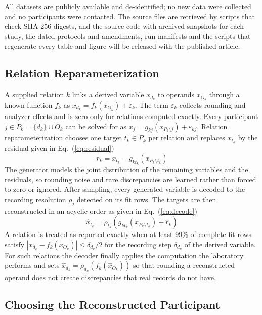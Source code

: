 \documentclass[conference]{IEEEtran}
\begin{document}
All datasets are publicly available and de-identified; no new data were collected and no participants were contacted. The source files are retrieved by scripts that check SHA-256 digests, and the source code with archived snapshots for each study, the dated protocols and amendments, run manifests and the scripts that regenerate every table and figure will be released with the published article.

\subsection{Relation Reparameterization}

A supplied relation $k$ links a derived variable $x_{d_k}$ to operands $x_{O_k}$ through a known function $f_k$ as $x_{d_k} = f_k(x_{O_k}) + \varepsilon_k$. The term $\varepsilon_k$ collects rounding and analyzer effects and is zero only for relations computed exactly. Every participant $j \in P_k = \{d_k\} \cup O_k$ can be solved for as $x_j = g_{kj}(x_{P_k \setminus j}) + \varepsilon_{kj}$. Relation reparameterization chooses one target $t_k \in P_k$ per relation and replaces $x_{t_k}$ by the residual given in Eq.~(\ref{eq:residual})
\begin{equation}
r_k = x_{t_k} - g_{k t_k}\!\left(x_{P_k \setminus t_k}\right)
\label{eq:residual}
\end{equation}
The generator models the joint distribution of the remaining variables and the residuals, so rounding noise and rare discrepancies are learned rather than forced to zero or ignored. After sampling, every generated variable is decoded to the recording resolution $\rho_j$ detected on its fit rows. The targets are then reconstructed in an acyclic order as given in Eq.~(\ref{eq:decode})
\begin{equation}
\hat{x}_{t_k} = \rho_{t_k}\!\left( g_{k t_k}(\hat{x}_{P_k \setminus t_k}) + \hat{r}_k \right)
\label{eq:decode}
\end{equation}
A relation is treated as reported exactly when at least 99\% of complete fit rows satisfy $|x_{d_k} - f_k(x_{O_k})| \le \delta_{d_k}/2$ for the recording step $\delta_{d_k}$ of the derived variable. For such relations the decoder finally applies the computation the laboratory performs and sets $\hat{x}_{d_k} = \rho_{d_k}(f_k(\hat{x}_{O_k}))$ so that rounding a reconstructed operand does not create discrepancies that real records do not have.

\subsection{Choosing the Reconstructed Participant}
\end{document}

